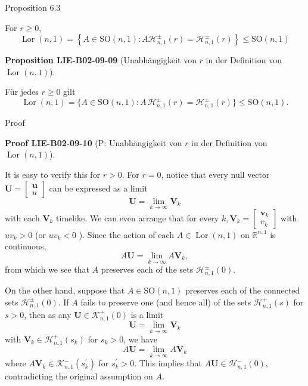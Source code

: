 \documentclass[10pt, letterpaper]{article}
\newcommand{\CustomHeading}[3]{%
  \par\medskip\noindent%
  \textbf{#1 #2} \textnormal{(#3)}.\enskip%
}
\newenvironment{PROP}[2]{\begin{unitbox}\CustomHeading{Proposition}{#1}{#2}}{\end{unitbox}}
\newenvironment{PROOF}[2]{\begin{unitbox}\CustomHeading{Proof}{#1}{#2}}{\end{unitbox}}
\begin{document}
Proposition 6.3

For $r \geqslant 0$,
$$
\operatorname{Lor}(n, 1)=\left\{A \in \mathrm{SO}(n, 1): A \mathcal{H}_{n, 1}^{ \pm}(r)=\mathcal{H}_{n, 1}^{ \pm}(r)\right\} \leqslant \mathrm{SO}(n, 1)
$$



\begin{PROP}{LIE-B02-09-09}{Unabhängigkeit von \(r\) in der Definition von \(\operatorname{Lor}(n,1)\)}
Für jedes \(r\ge 0\) gilt
\[
\operatorname{Lor}(n,1)
=\{A\in \mathrm{SO}(n,1):A\,\mathcal H_{n,1}^{\pm}(r)=\mathcal H_{n,1}^{\pm}(r)\}
\le \mathrm{SO}(n,1).
\]
\end{PROP}


Proof


\begin{PROOF}{LIE-B02-09-10}{P: Unabhängigkeit von \(r\) in der Definition von \(\operatorname{Lor}(n,1)\)}
It is easy to verify this for $r>0$. For $r=0$, notice that every null vector $\mathbf{U}=\left[\begin{array}{l}\mathbf{u} \\ u\end{array}\right]$ can be expressed as a limit
$$
\mathbf{U}=\lim _{k \rightarrow \infty} \mathbf{V}_{k}
$$
with each $\mathbf{V}_{k}$ timelike. We can even arrange that for every $k, \mathbf{V}_{k}=\left[\begin{array}{l}\mathbf{v}_{k} \\ v_{k}\end{array}\right]$ with $u v_{k}>0$ (or $u v_{k}<0$ ). Since the action of each $A \in \operatorname{Lor}(n, 1)$ on $\mathbb{R}^{n, 1}$ is continuous,
$$
A \mathbf{U}=\lim _{k \rightarrow \infty} A \mathbf{V}_{k},
$$
from which we see that $A$ preserves each of the sets $\mathcal{H}_{n, 1}^{ \pm}(0)$.

On the other hand, suppose that $A \in \mathrm{SO}(n, 1)$ preserves each of the connected sets $\mathcal{H}_{n, 1}^{ \pm}(0)$. If $A$ fails to preserve one (and hence all) of the sets $\mathcal{H}_{n, 1}^{+}(s)$ for $s>0$, then as any $\mathbf{U} \in \mathcal{K}_{n, 1}^{+}(0)$ is a limit
$$
\mathbf{U}=\lim _{k \rightarrow \infty} \mathbf{V}_{k}
$$
with $\mathbf{V}_{k} \in \mathcal{H}_{n, 1}^{+}\left(s_{k}\right)$ for $s_{k}>0$, we have
$$
A \mathbf{U}=\lim _{k \rightarrow \infty} A \mathbf{V}_{k}
$$
where $A \mathbf{V}_{k} \in \mathcal{K}_{n, 1}^{-}\left(s_{k}^{\prime}\right)$ for $s_{k}^{\prime}>0$. This implies that $A \mathbf{U} \in \mathcal{H}_{n, 1}^{-}(0)$, contradicting the original assumption on $A$.
\end{PROOF}
\end{document}
